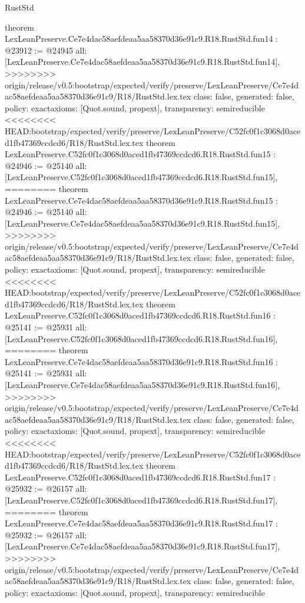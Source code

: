 \begin{lexlean}{RustStd}
\begin{coremodule}
{\begin{coremodule}
{{{{{{{{{{{{{{{{{theorem LexLeanPreserve.Ce7e4dac58aefdeaa5aa58370d36e91c9.R18.RustStd.fun14 : @23912 := @24945 {
  all: [LexLeanPreserve.Ce7e4dac58aefdeaa5aa58370d36e91c9.R18.RustStd.fun14],
>>>>>>>> origin/release/v0.5:bootstrap/expected/verify/preserve/LexLeanPreserve/Ce7e4dac58aefdeaa5aa58370d36e91c9/R18/RustStd.lex.tex
  class: false,
  generated: false,
  policy: exact{axioms: [Quot.sound, propext]},
  transparency: semireducible
}
<<<<<<<< HEAD:bootstrap/expected/verify/preserve/LexLeanPreserve/C52fc0f1c3068d0aced1fb47369ccdcd6/R18/RustStd.lex.tex
theorem LexLeanPreserve.C52fc0f1c3068d0aced1fb47369ccdcd6.R18.RustStd.fun15 : @24946 := @25140 {
  all: [LexLeanPreserve.C52fc0f1c3068d0aced1fb47369ccdcd6.R18.RustStd.fun15],
========
theorem LexLeanPreserve.Ce7e4dac58aefdeaa5aa58370d36e91c9.R18.RustStd.fun15 : @24946 := @25140 {
  all: [LexLeanPreserve.Ce7e4dac58aefdeaa5aa58370d36e91c9.R18.RustStd.fun15],
>>>>>>>> origin/release/v0.5:bootstrap/expected/verify/preserve/LexLeanPreserve/Ce7e4dac58aefdeaa5aa58370d36e91c9/R18/RustStd.lex.tex
  class: false,
  generated: false,
  policy: exact{axioms: [Quot.sound, propext]},
  transparency: semireducible
}
<<<<<<<< HEAD:bootstrap/expected/verify/preserve/LexLeanPreserve/C52fc0f1c3068d0aced1fb47369ccdcd6/R18/RustStd.lex.tex
theorem LexLeanPreserve.C52fc0f1c3068d0aced1fb47369ccdcd6.R18.RustStd.fun16 : @25141 := @25931 {
  all: [LexLeanPreserve.C52fc0f1c3068d0aced1fb47369ccdcd6.R18.RustStd.fun16],
========
theorem LexLeanPreserve.Ce7e4dac58aefdeaa5aa58370d36e91c9.R18.RustStd.fun16 : @25141 := @25931 {
  all: [LexLeanPreserve.Ce7e4dac58aefdeaa5aa58370d36e91c9.R18.RustStd.fun16],
>>>>>>>> origin/release/v0.5:bootstrap/expected/verify/preserve/LexLeanPreserve/Ce7e4dac58aefdeaa5aa58370d36e91c9/R18/RustStd.lex.tex
  class: false,
  generated: false,
  policy: exact{axioms: [Quot.sound, propext]},
  transparency: semireducible
}
<<<<<<<< HEAD:bootstrap/expected/verify/preserve/LexLeanPreserve/C52fc0f1c3068d0aced1fb47369ccdcd6/R18/RustStd.lex.tex
theorem LexLeanPreserve.C52fc0f1c3068d0aced1fb47369ccdcd6.R18.RustStd.fun17 : @25932 := @26157 {
  all: [LexLeanPreserve.C52fc0f1c3068d0aced1fb47369ccdcd6.R18.RustStd.fun17],
========
theorem LexLeanPreserve.Ce7e4dac58aefdeaa5aa58370d36e91c9.R18.RustStd.fun17 : @25932 := @26157 {
  all: [LexLeanPreserve.Ce7e4dac58aefdeaa5aa58370d36e91c9.R18.RustStd.fun17],
>>>>>>>> origin/release/v0.5:bootstrap/expected/verify/preserve/LexLeanPreserve/Ce7e4dac58aefdeaa5aa58370d36e91c9/R18/RustStd.lex.tex
  class: false,
  generated: false,
  policy: exact{axioms: [Quot.sound, propext]},
  transparency: semireducible
}}}}}}}}}}}}}}}}}}}}}
\end{coremodule}}
\end{coremodule}
\end{lexlean}
